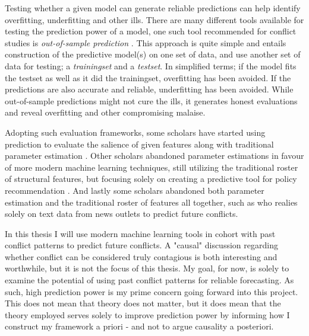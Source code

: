\documentclass[a4paper]{article}
\begin{document}
Testing whether a given model can generate reliable predictions can help identify overfitting, underfitting and other ills. There are many different tools available for testing the prediction power of a model, one such tool recommended for conflict studies is \emph{out-of-sample prediction} \citep{king_zeng_2001b, Ward_Greenhill_Bakke_2010, perry_2013, Schrodt_2014}. This approach is quite simple and entails construction of the predictive model(s) on one set of data, and use another set of data for testing; a \emph{trainingset} and a \emph{testset}. In simplified terms; if the model fits the testset as well as it did the trainingset, overfitting has been avoided. If the predictions are also accurate and reliable, underfitting has been avoided. While out-of-sample predictions might not cure the ills, it generates honest evaluations and reveal overfitting and other compromising malaise.\par

Adopting such evaluation frameworks, some scholars have started using prediction to evaluate the salience of given features along with traditional parameter estimation \citep{Goldstone_2010}. Other scholars abandoned parameter estimations in favour of more modern machine learning techniques, still utilizing the traditional roster of structural features, but focusing solely on creating a predictive tool for policy recommendation \citep{perry_2013}. And lastly some scholars abandoned both parameter estimation and the traditional roster of features all together, such as \cite{mueller_2016} who realies solely on text data from news outlets to predict future conflicts.\par

In this thesis I will use modern machine learning tools in cohort with past conflict patterns to predict future conflicts. A "causal" discussion regarding whether conflict can be considered truly contagious is both interesting and worthwhile, but it is not the focus of this thesis. My goal, for now, is solely to examine the potential of using past conflict patterns for reliable forecasting. As such, high prediction power is my prime concern going forward into this project. This does not mean that theory does not matter, but it does mean that the theory employed serves solely to improve prediction power by informing how I construct my framework a priori - and not to argue causality a posteriori.\par 
\end{document}
